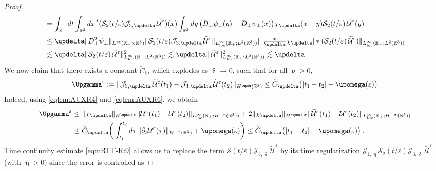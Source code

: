 \documentclass[11pt,reqno]{amsart}
\def \R{{\mathbb{R}}}
\begin{document}
\begin{proof}
\begin{align*}
        &= \int_{\R_+} dt \int_{\R^3}dx\, {}^t(\mathcal S_2(t/\varepsilon) \mathcal J_{3,\updelta} \,\widetilde{\mathcal U}^\varepsilon)(x) 
        \int_{\R^3}dy\, \big(D_\perp \psi_\perp(y)-D_\perp \psi_\perp(x)\big)\chi_\updelta(x-y) \mathcal S_2(t/\varepsilon)\,\widetilde{\mathcal U}^\varepsilon(y)\\
        &\leq \updelta \|D_\perp^2 \psi_\perp\|_{L^\infty(\R_+\times \R^3)}
        \| \mathcal S_2(t/\varepsilon) \mathcal J_{3,\updelta} \,\widetilde{\mathcal U}^\varepsilon \|_{L_{\rm loc}^\infty(\R_+; L^2(\R^3))}
        \| |\tfrac{x}{\updelta}\chi_\updelta| \ast (\mathcal S_2(t/\varepsilon)\,\widetilde{\mathcal U}^\varepsilon) \|_{L_{\rm loc}^\infty(\R_+; L^2(\R^3))}\\
        &\lesssim   \updelta
        \| \mathcal S_2(t/\varepsilon) \,\widetilde{\mathcal U}^\varepsilon \|_{L_{\rm loc}^\infty(\R_+; L^2(\R^3))}^2
        \lesssim \updelta \| \,\widetilde{\mathcal U}^\varepsilon \|_{L_{\rm loc}^\infty(\R_+; L^2(\R^3))}^2 \lesssim \updelta \,.
  \end{align*}
  We now claim that there exists a constant $\widetilde{C}_\updelta$, which explodes as $\updelta \rightarrow 0$, such that for all $\upnu \geq 0$, 
  \begin{equation}
    \label{eqn:RTT-R:9}
    \Upgamma^\varepsilon:= \|  \mathcal J_{3,\updelta} \,\widetilde{\mathcal U}^\varepsilon (t_1) -
    \mathcal J_{3,\updelta} \,\widetilde{\mathcal U}^\varepsilon (t_2)
    \|_{H^\upnu(\R^3)} \leq \widetilde{C}_\updelta \big( |t_1-t_2| + \upomega(\varepsilon) \big)
  \end{equation}
  Indeed, using \eqref{eqlem:AUXR4} and \eqref{eqlem:AUXR6}, we obtain
  \begin{align*}
    \Upgamma^\varepsilon & \leq \| \chi_\updelta \|_{H^{\upnu+r}}
    \| {\mathcal U}^\varepsilon (t_1)  - {\mathcal U}^\varepsilon (t_2)  \|_{L_{\rm loc}^\infty(\R_+; H^{-r}(\R^3))}
    + 2  \| \chi_\updelta \|_{H^{\upnu+\sigma}}  \| \widetilde{\mathcal U}^\varepsilon (t_1)  - {\mathcal U}^\varepsilon (t_2)  \|_{L_{\rm loc}^\infty(\R_+; H^{-\sigma}(\R^3))} \\
    & \leq \widetilde{C}_\updelta \bigg(\int_{t_1}^{t_2} d\tau\, \|\partial_t {\mathcal U}^\varepsilon (\tau) \|_{ H^{-r}(\R^3)} + \upomega(\varepsilon) \bigg)
    \leq \widetilde{C}_\updelta \big( |t_1-t_2| + \upomega(\varepsilon) \big)\,.
  \end{align*}
  Time continuity estimate \eqref{eqn:RTT-R:9} allows us to replace the term $\mathcal S (t/\varepsilon)  \mathcal J_{3,\updelta} \,\widetilde{\mathcal U}^\varepsilon $ by its time regularization $ \mathcal J_{1,\upeta}  \mathcal S_2(t/\varepsilon)  \mathcal J_{3,\updelta} \,\widetilde{\mathcal U}^\varepsilon $ (with $\upeta >0$) since the error is controlled as

\end{proof}
\end{document}
